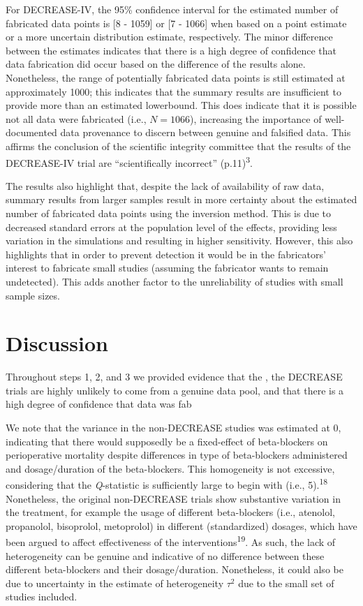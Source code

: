\documentclass[]{article}
\begin{document}
For DECREASE-IV, the 95\% confidence interval for the estimated number
of fabricated data points is {[}8 - 1059{]} or {[}7 - 1066{]} when based
on a point estimate or a more uncertain distribution estimate,
respectively. The minor difference between the estimates indicates that
there is a high degree of confidence that data fabrication did occur
based on the difference of the results alone. Nonetheless, the range of
potentially fabricated data points is still estimated at approximately
1000; this indicates that the summary results are insufficient to
provide more than an estimated lowerbound. This does indicate that it is
possible not all data were fabricated (i.e., \(N=1066\)), increasing the
importance of well-documented data provenance to discern between genuine
and falsified data. This affirms the conclusion of the scientific
integrity committee that the results of the DECREASE-IV trial are
``scientifically incorrect'' (p.11)\textsuperscript{3}.

The results also highlight that, despite the lack of availability of raw
data, summary results from larger samples result in more certainty about
the estimated number of fabricated data points using the inversion
method. This is due to decreased standard errors at the population level
of the effects, providing less variation in the simulations and
resulting in higher sensitivity. However, this also highlights that in
order to prevent detection it would be in the fabricators' interest to
fabricate small studies (assuming the fabricator wants to remain
undetected). This adds another factor to the unreliability of studies
with small sample sizes.

\section{Discussion}\label{discussion}

Throughout steps 1, 2, and 3 we provided evidence that the , the
DECREASE trials are highly unlikely to come from a genuine data pool,
and that there is a high degree of confidence that data was fab

We note that the variance in the non-DECREASE studies was estimated at
0, indicating that there would supposedly be a fixed-effect of
beta-blockers on perioperative mortality despite differences in type of
beta-blockers administered and dosage/duration of the beta-blockers.
This homogeneity is not excessive, considering that the
\emph{Q}-statistic is sufficiently large to begin with (i.e.,
5).\textsuperscript{18} Nonetheless, the original non-DECREASE trials
show substantive variation in the treatment, for example the usage of
different beta-blockers (i.e., atenolol, propanolol, bisoprolol,
metoprolol) in different (standardized) dosages, which have been argued
to affect effectiveness of the interventions\textsuperscript{19}. As
such, the lack of heterogeneity can be genuine and indicative of no
difference between these different beta-blockers and their
dosage/duration. Nonetheless, it could also be due to uncertainty in the
estimate of heterogeneity \(\tau^2\) due to the small set of studies
included.
\end{document}
